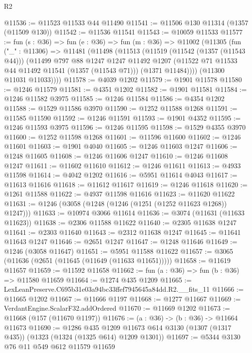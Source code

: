 \begin{lexlean}{R2}
\begin{coremodule}
@11536 := @11523 @11533 @44 @11490
@11541 := @11506 @130 @11314 (@1357 (@11509 @130))
@11542 := @11536 @11541
@11543 := @10059 @11533
@11577 := fun (s : @36) =>
  fun (e : @36) =>
  fun (m : @36) =>
  @11002
    (@11305
      (fun ("_" : @11306) =>
      @11481
        (@11498
          (@11513
            (@11519
              (@11542 (@1357 (@11543 @44)))
              (@11499
                @797
                @88
                @1247
                @1247
                @11492
                @1207
                (@11522 @71 @11533 @44 @11492 @11541 (@1357 (@11543 @71)))
                (@1371 @11484))))
          (@11300 @11031 @11033))))
@11578 := @4039 @1202
@11579 := @1901 @11578
@11580 := @1246 @11579
@11581 := @4351 @1202
@11582 := @1901 @11581
@11584 := @1246 @11582 @3975
@11585 := @1246 @11584
@11586 := @4354 @1202
@11588 := @1529 @11586 @3970
@11590 := @1252 @11588 @1268
@11591 := @11585 @11590
@11592 := @1246 @11591
@11593 := @1901 @4352
@11595 := @1246 @11593 @3975
@11596 := @1246 @11595
@11598 := @1529 @4355 @3970
@11600 := @1252 @11598 @1268
@11601 := @11596 @11600
@11602 := @1246 @11601
@11603 := @1901 @4040
@11605 := @1246 @11603 @1247
@11606 := @1248 @11605
@11608 := @1246 @11606 @1247
@11610 := @1246 @11608 @1247
@11611 := @11602 @11610
@11612 := @1246 @11611
@11613 := @4933 @11598
@11614 := @4042 @1202
@11616 := @5951 @11614 @4043
@11617 := @11613 @11616
@11618 := @11612 @11617
@11619 := @1246 @11618
@11620 := @1261 @11588
@11622 := @4937 @11598 @11616
@11623 := @11620 @11622
@11631 := @1246 (@3058 (@1248 (@1246 (@1251 (@1252 @11623 @1268)) @1247)))
@11633 := @10974 @3066 @11614
@11636 := @3074 (@11631 (@11633 @11623))
@11638 := @2306 @11588 @11622
@11640 := @2305 @11638 @1247
@11641 := @2303 @11640
@11643 := @2312 @11638 @1247
@11645 := @11641 @11643 @1247
@11646 := @2651 @1247
@11647 := @1248 @11646
@11649 := @1246 (@3058 @11647)
@11651 := @5951 @11588 @11622
@11657 := @3065 (@11636 (@2651 (@11645 (@11649 (@11633 @11651)))))
@11658 := @11619 @11657
@11659 := @11592 @11658
@11662 := fun (a : @36) => fun (b : @36) => @11580 @11659
@11664 := @1274 @435 @1209
@11665 := LexLeanPreserve.C695b31e03a94bc33ffef7945645a84dd.R2.__fits_11
@11666 := @11665 @1202
@11667 := @11666 @1197
@11668 := @1277 @11667
@11669 := VerdantEngine.ScalarF32.addOrdered
@11670 := @11669 @1202
@11673 := @11668 (@157 (@11670 @1197))
@11676 := (a : @36) -> (b : @36) -> @11664 @11673
@11690 := @1286
    @435
    @1209
    @11673
    @614
    @3130
    (@1307 (@1317 @435))
    (@1323 (@1324 (@1325 @614) @1209 @1301))
@11697 := @5344 @3130 @76 @11 @549 @612 @11579 @11659

\end{coremodule}
\end{lexlean}
